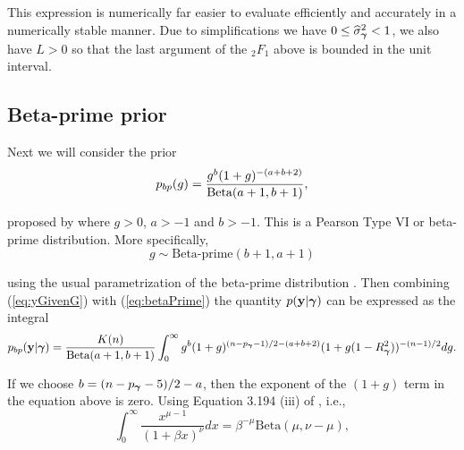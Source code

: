 
\noindent This expression is numerically far easier to evaluate efficiently and
accurately in a numerically stable manner. Due to simplifications we have $0\le
\widehat{\sigma}_{\boldsymbol \gamma}^2<1$, we also have $L>0$ so that the last argument of
the ${}_2F_1$ above is bounded in the unit interval.  


\subsection{Beta-prime prior} 

\noindent Next we will consider the prior 
\begin{equation}\label{eq:betaPrime}
	\displaystyle p_{bp}(g) = \frac{g^{b}(1 + g)^{-(a+b+2)}}{\mbox{Beta}(a+1,b+1)},
\end{equation}

\noindent proposed by \cite{Maruyama2011} where $g>0$, $a>-1$ and $b>-1$.  This
is a Pearson Type VI or beta-prime distribution. More specifically, 
$$
g\sim
\mbox{Beta-prime}(b+1,a+1)
$$ 

\noindent using the usual parametrization of the beta-prime
distribution \citep{Johnson1995}.  Then combining (\ref{eq:yGivenG}) with
(\ref{eq:betaPrime}) the quantity $p({\bf y}|{\boldsymbol \gamma})$ can be expressed as the
integral
$$
\displaystyle p_{bp}({\bf y}|{\boldsymbol \gamma}) 
=
\frac{K(n)}{\mbox{Beta}(a+1,b+1)}
\int_0^\infty             
g^{b}(1 + g)^{(n - p_{\boldsymbol \gamma} - 1)/2 - (a + b + 2)}  (1 + g (1-R_{\boldsymbol \gamma}^2) )^{-(n-1)/2}  
dg.
$$

\noindent If we choose 
$b = (n - p_{\boldsymbol \gamma} - 5)/2 - a$, then the exponent of the $(1 + g)$ term in the
equation above is zero.  Using Equation 3.194 (iii) of \cite{Gradshteyn2007},
i.e.,
$$
\int_0^\infty \frac{ x^{\mu - 1} }{(1 + \beta x)^\nu} dx = \beta^{-\mu} \mbox{Beta}(\mu,\nu - \mu),
$$

